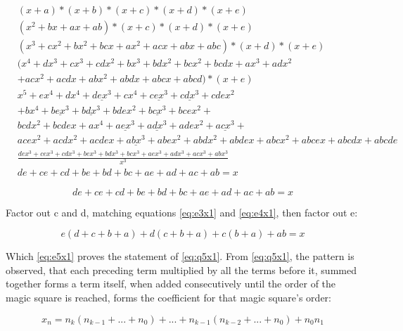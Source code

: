 \documentclass[a4paper]{article}
\begin{document}
\begin{equation*} \begin{aligned}
& (x + a) * (x + b) * (x + c) * (x + d) * (x + e) \\
& (x^2 + bx + ax + ab) * (x + c) * (x + d) * (x + e) \\
& (x^3 + cx^2 + bx^2 + bcx + ax^2 + acx + abx + abc) * (x + d) * (x + e) \\
& (x^4 + dx^3 + cx^3 + cdx^2 + bx^3 + bdx^2 + bcx^2 + bcdx + ax^3 + adx^2 \\  & + acx^2 + acdx +  abx^2 + abdx + abcx + abcd) * (x + e) \\
& x^5 + ex^4 + dx^4 + \underline{dex^3} + cx^4 + \underline{cex^3} + \underline{cdx^3} + cdex^2 \\ & + bx^4 + \underline{bex^3} + \underline{bdx^3} + bdex^2 + \underline{bcx^3} + bcex^2 + \\ & bcdx^2  + bcdex + ax^4 + \underline{aex^3} + \underline{adx^3} + adex^2 + \underline{acx^3} + \\ & acex^2 + acdx^2 + acdex + \underline{abx^3} + abex^2 + abdx^2 + abdex + abcx^2 + abcex + abcdx + abcde \\
& \frac{dex^3 + cex^3 + cdx^3 + bex^3 + bdx^3 + bcx^3 + aex^3 + adx^3 + acx^3 + abx^3}{x^3} \\
& de + ce + cd + be + bd + bc + ae + ad + ac + ab = x
\end{aligned} \end{equation*}

\begin{equation}
de + ce + cd + be + bd + bc + ae + ad + ac + ab = x \label{eq:ee5x1}
\end{equation}

Factor out c and d, matching equations \eqref{eq:e3x1} and \eqref{eq:e4x1}, then factor out e:

\begin{equation}
e(d + c + b + a) + d(c + b + a) + c(b + a) + ab = x \label{eq:e5x1}
\end{equation}

Which \eqref{eq:e5x1} proves the statement of \eqref{eq:q5x1}.  From \eqref{eq:q5x1}, the pattern is observed, that each preceding term multiplied by all the terms before it, summed together forms a term itself, when added consecutively until the order of the magic square is reached, forms the coefficient for that magic square's order:

\begin{equation}
x_n = n_{k}(n_{k-1} + ... + n_{0}) + ... + n_{k-1}(n_{k-2} + ... + n_{0}) + n_{0}n_{1} \label{eq:fx1}
\end{equation}
\end{document}
